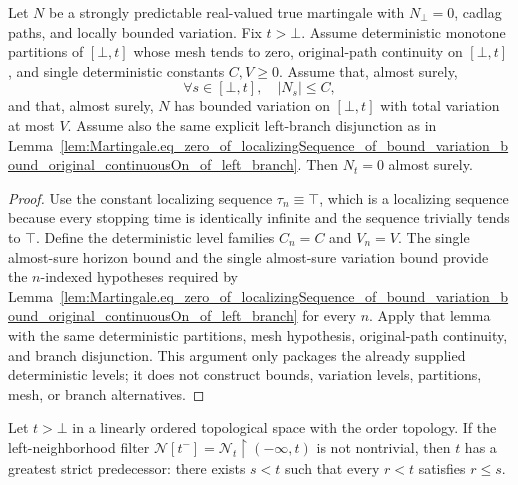 \begin{lemma}\label{lem:Martingale.eq_zero_of_bound_variation_bound_original_continuousOn_of_left_branch}
Let \(N\) be a strongly predictable real-valued true martingale with
\(N_\bot=0\), cadlag paths, and locally bounded variation.  Fix
\(t>\bot\).  Assume deterministic monotone partitions of \([\bot,t]\) whose
mesh tends to zero, original-path continuity on \([\bot,t]\), and single
deterministic constants \(C,V\ge0\).  Assume that, almost surely,
\[
  \forall s\in[\bot,t],\quad |N_s|\le C,
\]
and that, almost surely, \(N\) has bounded variation on \([\bot,t]\) with
total variation at most \(V\).  Assume also the same explicit left-branch
disjunction as in
Lemma~\ref{lem:Martingale.eq_zero_of_localizingSequence_of_bound_variation_bound_original_continuousOn_of_left_branch}.
Then \(N_t=0\) almost surely.
\end{lemma}

\begin{proof}
Use the constant localizing sequence \(\tau_n\equiv\top\), which is a
localizing sequence because every stopping time is identically infinite and
the sequence trivially tends to \(\top\).  Define the deterministic level
families \(C_n=C\) and \(V_n=V\).  The single almost-sure horizon bound and
the single almost-sure variation bound provide the \(n\)-indexed hypotheses
required by
Lemma~\ref{lem:Martingale.eq_zero_of_localizingSequence_of_bound_variation_bound_original_continuousOn_of_left_branch}
for every \(n\).  Apply that lemma with the same deterministic partitions,
mesh hypothesis, original-path continuity, and branch disjunction.  This
argument only packages the already supplied deterministic levels; it does not
construct bounds, variation levels, partitions, mesh, or branch alternatives.
\end{proof}

\begin{lemma}\label{lem:Filter.exists_greatest_lt_of_not_neBot_nhdsWithin_Iio}
Let \(t>\bot\) in a linearly ordered topological space with the order
topology.  If the left-neighborhood filter
\(\mathcal N[t^-]=\mathcal N_t\!\restriction(-\infty,t)\) is not nontrivial,
then \(t\) has a greatest strict predecessor: there exists \(s<t\) such that
every \(r<t\) satisfies \(r\le s\).
\end{lemma}

